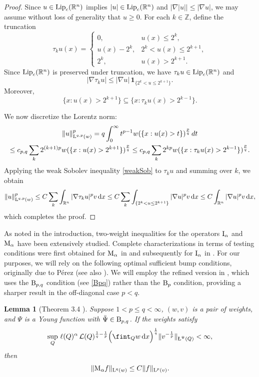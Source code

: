 \documentclass[11pt, a4paper, reqno]{amsart}
\newcommand{\R}{\mathbb R}
\newcommand{\Z}{\mathbb Z}
\newcommand{\dx}{\,{\mathrm dx}}
\newcommand{\Lup}{\textup{L}}
\newcommand{\Ldash}{\textup{\L}}
\DeclareMathOperator{\Lip}{\textup{Lip}}
\newtheorem{lemma}[theorem]{Lemma}
\theoremstyle{definition}
\theoremstyle{remark}
\begin{document}
\begin{proof}
Since $u \in \Lip_c(\R^n)$ implies $|u| \in \Lip_c(\R^n)$ and $|\nabla |u|| \le |\nabla u|$, we may assume without loss of generality that $u \ge 0$.  
For each $k \in \Z$, define the truncation
\[
\tau_k u(x) =
\begin{cases}
0, & u(x) \le 2^k, \\
u(x) - 2^k, & 2^k < u(x) \le 2^{k+1}, \\
2^k, & u(x) > 2^{k+1}.
\end{cases}
\]
Since $\Lip_c(\R^n)$ is preserved under truncation, we have $\tau_k u \in \Lip_c(\R^n)$ and
\[
|\nabla \tau_k u| \le |\nabla u|\,\mathbf{1}_{\{2^k < u \le 2^{k+1}\}}.
\]
Moreover,
\[
\{x : u(x) > 2^{k+1}\} \subseteq \{x : \tau_k u(x) > 2^{k-1}\}.
\]

We now discretize the Lorentz norm:
\begin{multline*}
\|u\|_{\Lup^{q,p}(w)}^p
= q\int_0^\infty t^{p-1} w(\{x : u(x) > t\})^{\frac{p}{q}}\,dt \\
\le c_{p,q}\sum_k 2^{(k+1)p} w(\{x : u(x) > 2^{k+1}\})^{\frac{p}{q}}
\le c_{p,q}\sum_k 2^{kp} w(\{x : \tau_k u(x) > 2^{k-1}\})^{\frac{p}{q}}.
\end{multline*}
Applying the weak Sobolev inequality \eqref{weakSob} to $\tau_k u$ and summing over $k$, we obtain
\[
\|u\|_{\Lup^{q,p}(w)}^p
\le C\sum_k \int_{\R^n} |\nabla \tau_k u|^p v\dx 
\le C\sum_k  \int_{\{2^k<u\leq 2^{k+1}\}} |\nabla u|^p v\dx 
\le C\int_{\R^n} |\nabla u|^p v\dx,
\]
which completes the proof.
\end{proof}

As noted in the introduction, two-weight inequalities for the operators \(\textup{I}_\alpha\) and \(\textup{M}_\alpha\) have been extensively studied. Complete characterizations in terms of testing conditions were first obtained for \(\textup{M}_\alpha\) in \cite{Saw82} and subsequently for \(\textup{I}_\alpha\) in \cite{Saw84,Saw88}. For our purposes, we will rely on the following optimal sufficient bump conditions, originally due to P\'erez \cite{Per94} (see also \cite{Per95two}). We will employ the refined version in \cite{CM}, which uses the \(\textup B_{p,q}\) condition (see \eqref{Bpq}) rather than the \(\textup B_p\) condition, providing a sharper result in the off-diagonal case \(p<q\).

\begin{lemma}[Theorem 3.4 \cite{CM}] \label{strongbumpM}
Suppose $1<p\leq q<\infty$, \((w,v)\) is a pair of weights, and \(\Psi\) is a Young function with \(\bar{\Psi}\in \textup B_{p,q}\). If the weights satisfy
\[
\sup_Q \, \ell(Q)^\alpha \, \mathcal{L}(Q)^{\frac{1}{q}-\frac{1}{p}}
\Bigl(\fint_Q w \dx \Bigr)^{\frac{1}{q}}
\|v^{-\frac{1}{p}}\|_{\Ldash^\Psi(Q)} < \infty,
\]
then 
\[
\|\textup{M}_\alpha f\|_{\Lup^q(w)} \le C \|f\|_{\Lup^p(v)}.
\]
\end{lemma}
\end{document}
